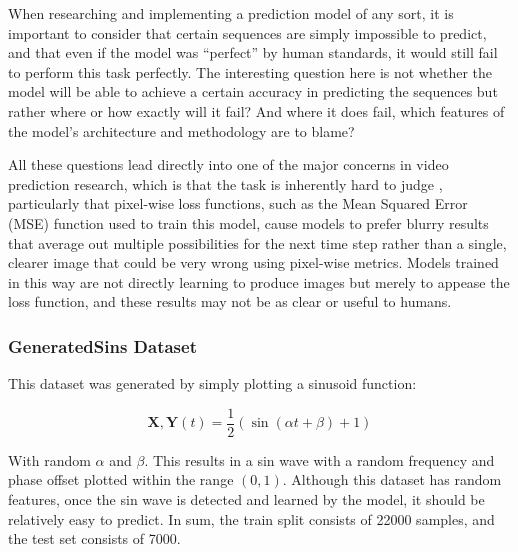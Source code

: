 \documentclass{scrartcl}
\begin{document}
When researching and implementing a prediction model of any sort, it is
important to consider that certain sequences are simply impossible to predict,
and that even if the model was ``perfect'' by human standards, it would still
fail to perform this task perfectly. The interesting question here is not
whether the model will be able to achieve a certain accuracy in predicting the
sequences but rather where or how exactly will it fail? And where it does fail,
which features of the model's architecture and methodology are to blame?

All these questions lead directly into one of the major concerns in video
prediction research, which is that the task is inherently hard to judge
\cite{video_prediction_survey}, particularly that pixel-wise loss functions,
such as the Mean Squared Error (MSE) function used to train this model, cause
models to prefer blurry results that average out multiple possibilities for the
next time step rather than a single, clearer image that could be very wrong
using pixel-wise metrics. Models trained in this way are not directly learning
to produce images but merely to appease the loss function, and these results
may not be as clear or useful to humans.


\subsubsection{GeneratedSins Dataset}
\label{subsubsec:generatedsins_intro}

This dataset was generated by simply plotting a sinusoid function:

\begin{equation}
	{ \boldsymbol{X}, \boldsymbol{Y} } (t) = \frac{1}{2} ( \sin (\alpha t + \beta) + 1)
	\label{eq:generated_sins}
\end{equation}

With random $\alpha$ and $\beta$. This results in a sin wave with a random
frequency and phase offset plotted within the range $(0, 1)$. Although this
dataset has random features, once the sin wave is detected and learned by the
model, it should be relatively easy to predict. In sum, the train split
consists of 22000 samples, and the test set consists of 7000.
\end{document}
